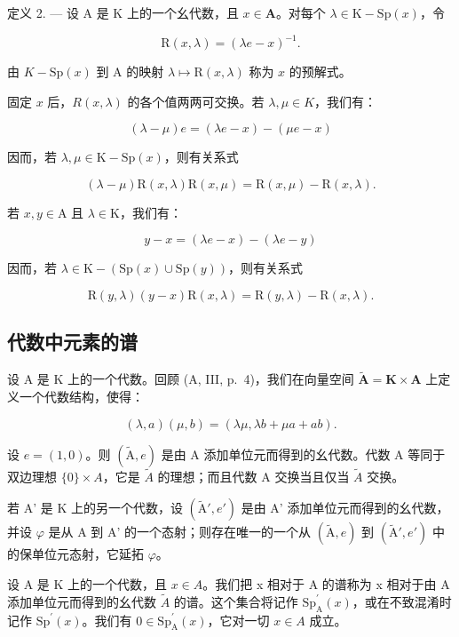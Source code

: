 定义 2. --- 设 A 是 K 上的一个幺代数，且 \(x \in \mathbf{A}\)。对每个 \(\lambda \in \mathrm{K} - \mathrm{Sp}(x)\)，令

\[
\mathrm{R} (x, \lambda) = (\lambda e - x) ^ {- 1}.
\]

由 \(K-\mathrm{Sp}(x)\) 到 A 的映射 \(\lambda\mapsto\mathrm{R}(x,\lambda)\) 称为 \(x\) 的预解式。

固定 \(x\) 后，\(R(x, \lambda)\) 的各个值两两可交换。若 \(\lambda, \mu \in K\)，我们有：

\[
(\lambda - \mu) e = (\lambda e - x) - (\mu e - x)
\]

因而，若 \(\lambda, \mu \in \mathrm{K} - \mathrm{Sp}(x)\)，则有关系式

\[
(\lambda - \mu) \mathrm{R} (x, \lambda) \mathrm{R} (x, \mu) = \mathrm{R} (x, \mu) - \mathrm{R} (x, \lambda).\tag{1}
\]

若 \(x,y\in \mathrm{A}\) 且 \(\lambda \in \mathrm{K}\)，我们有：

\[
y - x = (\lambda e - x) - (\lambda e - y)
\]

因而，若 \(\lambda\in\mathrm{K}-(\mathrm{Sp}(x)\cup\mathrm{Sp}(y))\)，则有关系式

\[
\mathrm{R} (y, \lambda) (y - x) \mathrm{R} (x, \lambda) = \mathrm{R} (y, \lambda) - \mathrm{R} (x, \lambda).\tag{2}
\]

\subsection{代数中元素的谱}

设 A 是 K 上的一个代数。回顾 (A, III, p.~4)，我们在向量空间 \(\widetilde{\mathbf{A}} = \mathbf{K} \times \mathbf{A}\) 上定义一个代数结构，使得：

\[
(\lambda , a) (\mu , b) = (\lambda \mu , \lambda b + \mu a + a b).
\]

设 \(e = (1, 0)\)。则 \((\tilde{\mathrm{A}}, e)\) 是由 A 添加单位元而得到的幺代数。代数 A 等同于双边理想 \(\{0\} \times A\)，它是 \(\tilde{A}\) 的理想；而且代数 A 交换当且仅当 \(\tilde{A}\) 交换。

若 A' 是 K 上的另一个代数，设 \((\tilde{\mathrm{A}}', e')\) 是由 A' 添加单位元而得到的幺代数，并设 \(\varphi\) 是从 A 到 A' 的一个态射；则存在唯一的一个从 \((\tilde{\mathrm{A}}, e)\) 到 \((\tilde{\mathrm{A}}', e')\) 中的保单位元态射，它延拓 \(\varphi\)。

设 A 是 K 上的一个代数，且 \(x \in A\)。我们把 x 相对于 A 的谱称为 x 相对于由 A 添加单位元而得到的幺代数 \(\widetilde{A}\) 的谱。这个集合将记作 \(\mathrm{Sp}_{\mathrm{A}}^{\prime}(x)\)，或在不致混淆时记作 \(\mathrm{Sp}^{\prime}(x)\)。我们有 \(0 \in \mathrm{Sp}_{\mathrm{A}}^{\prime}(x)\)，它对一切 \(x \in A\) 成立。

